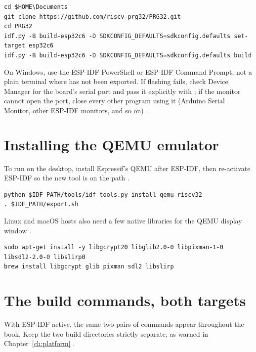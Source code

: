 \begin{lstlisting}[style=bash,caption={Windows standalone path, run from the ESP-IDF PowerShell shortcut.}]
cd $HOME\Documents
git clone https://github.com/riscv-prg32/PRG32.git
cd PRG32
idf.py -B build-esp32c6 -D SDKCONFIG_DEFAULTS=sdkconfig.defaults set-target esp32c6
idf.py -B build-esp32c6 -D SDKCONFIG_DEFAULTS=sdkconfig.defaults build
\end{lstlisting}

\begin{prgwarn}
On Windows, use the ESP-IDF PowerShell or ESP-IDF Command Prompt, not a plain
terminal where  has not been exported. If flashing fails, check Device
Manager for the board's serial port and pass it explicitly with ; if
the monitor cannot open the port, close every other program using it (Arduino
Serial Monitor, other ESP-IDF monitors, and so on) \citep{prg32repo}.
\end{prgwarn}

\section{Installing the QEMU emulator}

To run on the desktop, install Espressif's \riscv QEMU after ESP-IDF, then
re-activate ESP-IDF so the new tool is on the path \citep{prg32qemu}.

\begin{lstlisting}[style=bash,caption={Installing the RISC-V QEMU tool and re-activating ESP-IDF.}]
python $IDF_PATH/tools/idf_tools.py install qemu-riscv32
. $IDF_PATH/export.sh
\end{lstlisting}

Linux and macOS hosts also need a few native libraries for the QEMU display window
\citep{prg32qemu}.

\begin{lstlisting}[style=bash,caption={QEMU window libraries on Linux (top) and macOS (bottom).}]
sudo apt-get install -y libgcrypt20 libglib2.0-0 libpixman-1-0 libsdl2-2.0-0 libslirp0
brew install libgcrypt glib pixman sdl2 libslirp
\end{lstlisting}

\section{The build commands, both targets}

With ESP-IDF active, the same two pairs of commands appear throughout the book.
Keep the two build directories strictly separate, as warned in
Chapter~\ref{ch:platform} \citep{prg32qemu}.

